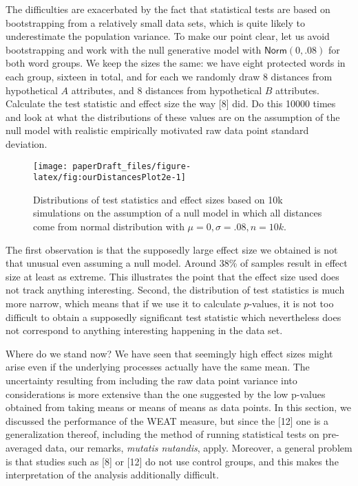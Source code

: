 \documentclass[
  12pt,
  dvipsnames,enabledeprecatedfontcommands]{scrartcl}
\begin{document}
The difficulties are exacerbated by the fact that statistical tests are
based on bootstrapping from a relatively small data sets, which is quite
likely to underestimate the population variance. To make our point
clear, let us avoid bootstrapping and work with the null generative
model with \(\mathsf{Norm}(0,.08)\) for both word groups. We keep the
sizes the same: we have eight protected words in each group, sixteen in
total, and for each we randomly draw 8 distances from hypothetical \(A\)
attributes, and \(8\) distances from hypothetical \(B\) attributes.
Calculate the test statistic and effect size the way {[}8{]} did. Do
this 10000 times and look at what the distributions of these values are
on the assumption of the null model with realistic empirically motivated
raw data point standard deviation.

\begin{figure}[H]

\begin{center}\texttt{[image: paperDraft\_files/figure-latex/fig:ourDistancesPlot2e-1]} \end{center}

\caption{Distributions of test statistics and effect sizes based on 10k simulations on the assumption of a null model in which all distances come from normal distribution with $\mu =0, \sigma = .08, n=10k$.}
\label{fig:ourDistances}
\end{figure}

The first observation is that the supposedly large effect size we
obtained is not that unusual even assuming a null model. Around 38\% of
samples result in effect size at least as extreme. This illustrates the
point that the effect size used does not track anything interesting.
Second, the distribution of test statistics is much more narrow, which
means that if we use it to calculate \(p\)-values, it is not too
difficult to obtain a supposedly significant test statistic which
nevertheless does not correspond to anything interesting happening in
the data set.

Where do we stand now? We have seen that seemingly high effect sizes
might arise even if the underlying processes actually have the same
mean. The uncertainty resulting from including the raw data point
variance into considerations is more extensive than the one suggested by
the low p-values obtained from taking means or means of means as data
points. In this section, we discussed the performance of the
\textsf{WEAT} measure, but since the {[}12{]} one is a generalization
thereof, including the method of running statistical tests on
pre-averaged data, our remarks, \emph{mutatis nutandis}, apply.
Moreover, a general problem is that studies such as {[}8{]} or {[}12{]}
do not use control groups, and this makes the interpretation of the
analysis additionally difficult.
\end{document}
